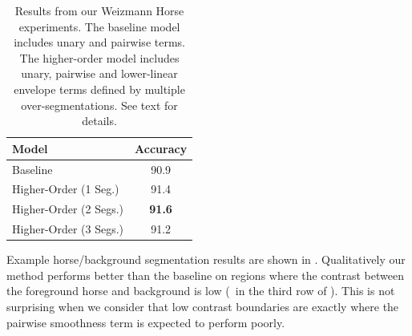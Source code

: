 \documentclass[10pt,journal,letterpaper,compsoc]{IEEEtran}
\begin{document}
\begin{table}
  \normalsize
  \centering
  \begin{tabular}{|l|c|}
    \hline
    {\sc Model} & {\sc Accuracy} \\
    \hline \hline
    Baseline & 90.9 \\
    \hline
    Higher-Order (1 Seg.) & 91.4 \\
    Higher-Order (2 Segs.) & {\bf 91.6} \\
    Higher-Order (3 Segs.) & 91.2 \\
    \hline
  \end{tabular}
  \caption{\label{tab:weizmann_results} Results from our Weizmann
    Horse experiments. The baseline model includes unary and pairwise
    terms. The higher-order model includes unary, pairwise and
    lower-linear envelope terms defined by multiple
    over-segmentations. See text for details.}
\end{table}

Example horse/background segmentation results are shown in
. Qualitatively our method performs
better than the baseline on regions where the contrast between the
foreground horse and background is low (\eg~in the third row of
). This is not surprising when we consider
that low contrast boundaries are exactly where the pairwise smoothness
term is expected to perform poorly.
\end{document}
